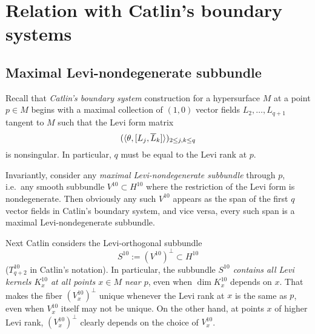 \documentclass[12pt]{amsart}
\begin{document}
%
%





\section{Relation with Catlin's boundary systems}
\subsection{Maximal Levi-nondegenerate subbundle}



Recall that {\em Catlin's boundary system} construction
for a hypersurface $M$ at a point $p\in M$
begins with a maximal collection of $(1,0)$ vector fields $L_2, \ldots, L_{q+1}$ tangent to $M$
such that the Levi form matrix 
$$
	(\langle \theta,  [L_j, \overline{L}_k] \rangle)_{2\le j,k \le q}
$$
is nonsingular. In particular, $q$ must be equal to the Levi rank at $p$.

Invariantly, consider any {\em maximal Levi-nondegenerate subbundle} through $p$,
i.e.\ any smooth subbundle  $V^{10} \subset H^{10}$ where the restriction of the Levi form is nondegenerate. 
Then obviously any such $V^{10}$ appears as the span
of the first $q$ vector fields in Catlin's boundary system,
and vice versa, every such span is a maximal Levi-nondegenerate subbundle.
%


Next Catlin considers the Levi-orthogonal subbundle 
$$
	S^{10} := (V^{10})^\perp \subset H^{10}
$$ 
($T^{10}_{q+2}$ in Catlin's notation).
In particular, the subbundle {\em $S^{10}$ contains all Levi kernels $K^{10}_x$ at all points $x\in M$ near $p$},
even when $\dim K^{10}_x$ depends on $x$.
That makes the fiber $(V^{10}_x)^\perp$ unique
whenever the Levi rank at $x$ is the same as $p$,
even when $V^{10}_x$ itself may not be unique.
On the other hand, at points $x$ of higher Levi rank,
$(V^{10}_x)^\perp$ clearly depends on the choice of $V^{10}_x$.
\end{document}
